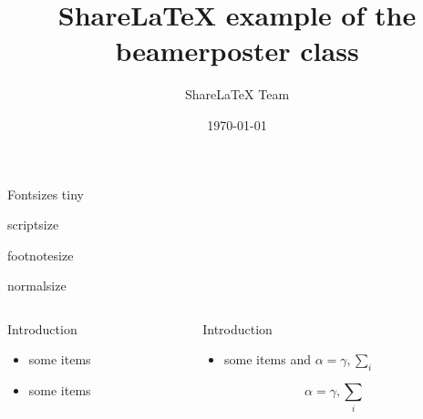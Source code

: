 \documentclass{beamer}
\title[Beamer Poster]{ShareLaTeX example of the beamerposter class}
\author[sharelatexteam@sharelate.com]{ShareLaTeX Team}
\institute[Sharelatex University]
  {The ShareLaTeX institute, Learn faculty}
\date{\today}
\begin{document}
  \begin{frame}{}
    \titlepage
    \vfill
    \begin{block}{\large Fontsizes}
      \centering
      {\tiny tiny}\par
      {\scriptsize scriptsize}\par
      {\footnotesize footnotesize}\par
      {\normalsize normalsize}\par
    \end{block}
 
    \vfill
    \begin{columns}[t]
      \begin{column}{.30\linewidth}
        \begin{block}{Introduction}
          \begin{itemize}
          \item some items
          \item some items
          \end{itemize}
        \end{block}
      \end{column}
      \begin{column}{.48\linewidth}
        \begin{block}{Introduction}
          \begin{itemize}
          \item some items and $\alpha=\gamma, \sum_{i}$
          \end{itemize}
          $$\alpha=\gamma, \sum_{i}$$
        \end{block}
      \end{column}
    \end{columns}
  \end{frame}
\end{document}
